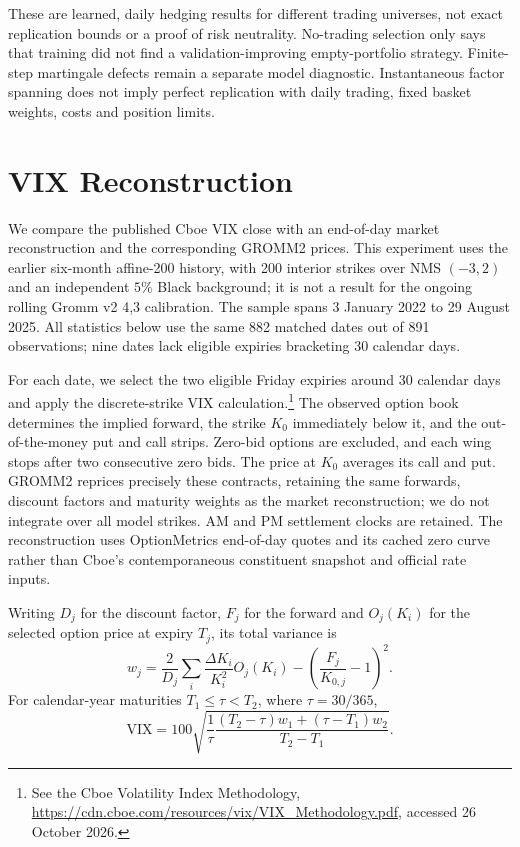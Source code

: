 \documentclass[11pt]{article}
\theoremstyle{plain}
\theoremstyle{definition}
\theoremstyle{remark}
\begin{document}
These are learned, daily hedging results for different trading universes,
not exact replication bounds or a proof of risk neutrality.  No-trading
selection only says that training did not find a validation-improving
empty-portfolio strategy.  Finite-step martingale defects remain a
separate model diagnostic.  Instantaneous factor spanning does not imply
perfect replication with daily trading, fixed basket weights, costs and
position limits.

\section{VIX Reconstruction}
\label{sec:vix-reconstruction}

We compare the published Cboe VIX close with an end-of-day market
reconstruction and the corresponding GROMM2 prices.  This experiment uses
the earlier six-month affine-200 history, with 200 interior strikes over
NMS $(-3,2)$ and an independent $5\%$ Black background; it is not a result
for the ongoing rolling Gromm v2 4,3 calibration.  The sample spans
3 January 2022 to 29 August 2025.  All statistics below use the same 882
matched dates out of 891 observations; nine dates lack eligible expiries
bracketing 30 calendar days.

For each date, we select the two eligible Friday expiries around 30
calendar days and apply the discrete-strike VIX calculation.\footnote{See
the Cboe Volatility Index Methodology,
\url{https://cdn.cboe.com/resources/vix/VIX_Methodology.pdf}, accessed
26 October 2026.}
The observed option book determines the implied forward, the strike $K_0$
immediately below it, and the out-of-the-money put and call strips.  Zero-bid
options are excluded, and each wing stops after two consecutive zero bids.
The price at $K_0$ averages its call and put.  GROMM2 reprices precisely
these contracts, retaining the same forwards, discount factors and maturity
weights as the market reconstruction; we do not integrate over all model
strikes.  AM and PM settlement clocks are retained.  The reconstruction
uses OptionMetrics end-of-day quotes and its cached zero curve rather
than Cboe's contemporaneous constituent snapshot and official rate inputs.

Writing $D_j$ for the discount factor, $F_j$ for the forward and $O_j(K_i)$
for the selected option price at expiry $T_j$, its total variance is
\begin{equation}
  w_j
  =\frac{2}{D_j}\sum_i\frac{\Delta K_i}{K_i^2}O_j(K_i)
   -\left(\frac{F_j}{K_{0,j}}-1\right)^2.
  \label{eq:vix-strip-total-variance}
\end{equation}
For calendar-year maturities $T_1\leq\tau<T_2$, where $\tau=30/365$,
\begin{equation}
  \mathrm{VIX}
  =100\sqrt{\frac{1}{\tau}
    \frac{(T_2-\tau)w_1+(\tau-T_1)w_2}{T_2-T_1}}.
  \label{eq:vix-constant-maturity}
\end{equation}
\end{document}
